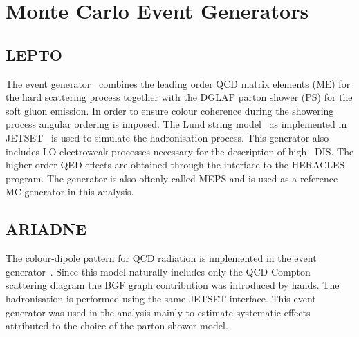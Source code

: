 \section{Monte Carlo Event Generators}
\subsection{LEPTO}
The \lepto event generator~\cite{lepto} combines the leading order QCD matrix elements (ME) for the hard scattering process together with the DGLAP parton shower (PS) for the soft gluon emission. In order to ensure colour coherence during the showering process angular ordering is imposed. The Lund string model~\cite{lund} as implemented in JETSET~\cite{jetset} is used to simulate the hadronisation process. This generator also includes LO electroweak processes necessary for the description of high-\qsq~DIS. The higher order QED effects are obtained through the interface to the HERACLES~\cite{heracles} program. The \lepto generator is also oftenly called MEPS and is used as a reference MC generator in this analysis.
\subsection{ARIADNE}
The colour-dipole pattern for QCD radiation is implemented in the \ariadne event generator~\cite{ariadne}. Since this model naturally includes only the QCD Compton scattering diagram the BGF graph contribution was introduced by hands. The hadronisation is performed using the same JETSET interface. This event generator was used in the analysis mainly to estimate systematic effects attributed to the choice of the parton shower model.
%